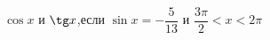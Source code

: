 \begin{ex}[type=calculate_expression]
	\begin{condition}
		\( \cos x \) и \( \tg x \),\quad если \( \sin x=-\dfrac{5}{13} \) и \( \dfrac{3\pi}{2} < x < 2\pi \)
	\end{condition}
\end{ex}